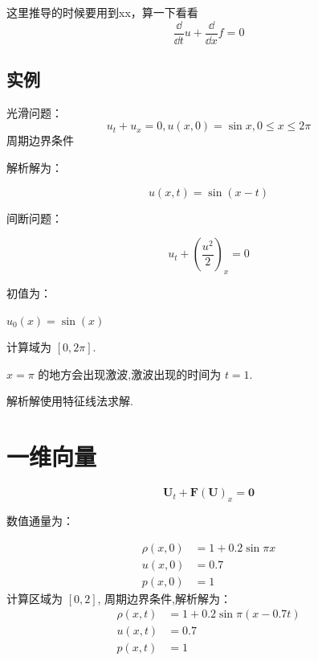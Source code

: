 \documentclass{book}
\begin{document}
这里推导的时候要用到xx，算一下看看
\begin{equation}
  \frac{\dd}{\dd t}u+\frac{\dd}{\dd x}f=0
\end{equation}

\subsection{实例}
\begin{example}
  光滑问题：
  \begin{equation}
    u_t+u_x=0,u(x,0)=\sin x,0\leqslant x\leqslant 2\pi
  \end{equation}
  周期边界条件

  解析解为：

  \begin{equation}
    u(x,t) = \sin(x-t)
  \end{equation}
\end{example}

\begin{example}
  间断问题：

  \begin{equation}
    u_{t}+\left(\frac{u^{2}}{2}\right)_{x}=0
  \end{equation}

  初值为：

  $u_0(x)=\sin(x)$

  计算域为 $[0,2\pi]$.

  $x=\pi$ 的地方会出现激波,激波出现的时间为 $t=1$.

  解析解使用特征线法求解.
\end{example}




\section{一维向量}

\begin{equation}
  \mathbf{U}_{t}+\mathbf{F}(\mathbf{U})_{x}=\mathbf{0}
\end{equation}

数值通量为：

\begin{example}
  \begin{equation}
    \begin{aligned}
      \rho(x, 0) & =1+0.2 \sin \pi x \\
      u(x, 0)    & =0.7              \\
      p(x, 0)    & =1
    \end{aligned}
  \end{equation}
  计算区域为 $[0,2]$, 周期边界条件,解析解为：
  \begin{equation}
    \begin{aligned}
      \rho(x, t) & =1+0.2 \sin \pi(x-0.7 t) \\
      u(x, t)    & =0.7                     \\
      p(x, t)    & =1
    \end{aligned}
  \end{equation}


\end{example}
\end{document}
